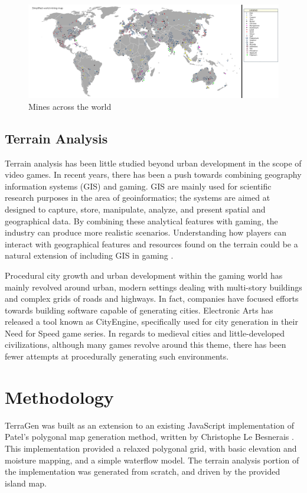 \begin{figure}
\includegraphics[width=\textwidth]{mining.png}
\caption{Mines across the world}
\end{figure}

\subsection{Terrain Analysis}
Terrain analysis has been little studied beyond urban development in the scope of video games. In recent years, there has been a push towards combining geography information systems (GIS) and gaming. GIS are mainly used for scientific research purposes in the area of geoinformatics; the systems are aimed at designed to capture, store, manipulate, analyze, and present spatial and geographical data. By combining these analytical features with gaming, the industry can produce more realistic scenarios. Understanding how players can interact with geographical features and resources found on the terrain could be a natural extension of including GIS in gaming \cite{Borneman:2011:Online}.

Procedural city growth and urban development within the gaming world has mainly revolved around urban, modern settings dealing with multi-story buildings and complex grids of roads and highways. In fact, companies have focused efforts towards building software capable of generating cities. Electronic Arts has released a tool known as CityEngine, specifically used for city generation in their Need for Speed game series\cite{10.1109/MCG.2008.58}. In regards to medieval cities and little-developed civilizations, although many games revolve around this theme, there has been fewer attempts at procedurally generating such environments.

\section{Methodology}

TerraGen was built as an extension to an existing JavaScript implementation of Patel's polygonal map generation method, written by Christophe Le Besnerais \cite{LeBesnec:2015:Online}. This implementation provided a relaxed polygonal grid, with basic elevation and moisture mapping, and a simple waterflow model. The terrain analysis portion of the implementation was generated from scratch, and driven by the provided island map.

